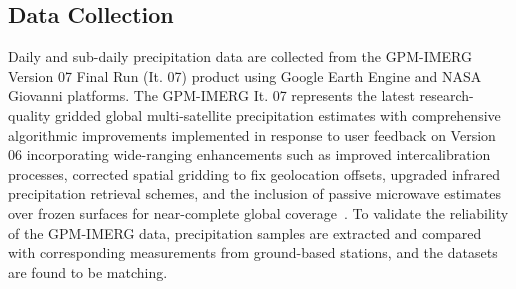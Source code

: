 \subsection{Data Collection}
Daily and sub-daily precipitation data are collected from the GPM-IMERG Version 07 Final Run (It. 07) product using Google Earth Engine and NASA Giovanni platforms.
The GPM-IMERG It. 07 represents the latest research-quality gridded global multi-satellite precipitation estimates with comprehensive algorithmic improvements implemented in response to user feedback on Version 06 incorporating wide-ranging enhancements such as improved intercalibration processes, corrected spatial gridding to fix geolocation offsets, upgraded infrared precipitation retrieval schemes, and the inclusion of passive microwave estimates over frozen surfaces for near-complete global coverage~\cite{21}.
To validate the reliability of the GPM-IMERG data, precipitation samples are extracted and compared with corresponding measurements from ground-based stations, and the datasets are found to be matching.
